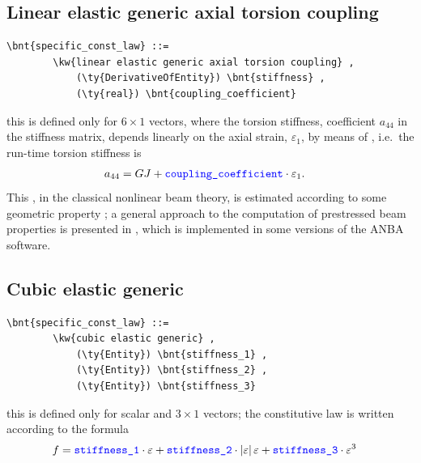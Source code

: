 \subsection{Linear elastic generic axial torsion coupling}
\label{sec:ConstitutiveLaw:LINEAR-ELASTIC-GENERIC-AXIAL-TORSION-COUPLING}
\begin{Verbatim}[commandchars=\\\{\}]
    \bnt{specific_const_law} ::= 
        \kw{linear elastic generic axial torsion coupling} ,
            (\ty{DerivativeOfEntity}) \bnt{stiffness} ,
            (\ty{real}) \bnt{coupling_coefficient}
\end{Verbatim}
this is defined only for $6 \times 1$ vectors, where the torsion stiffness,
coefficient $ a_{44} $ in the stiffness matrix, depends linearly on 
the axial strain, $ \varepsilon_1 $, by means of 
, i.e.\ the run-time torsion stiffness is 
\begin{align}
	a_{44}
	&=
	GJ + \textcolor{blue}{\texttt{coupling\_coefficient}} \cdot \varepsilon_1 .
\end{align}
This , in the classical nonlinear beam theory,
is estimated according to some geometric property \cite{HOUBOLT-BROOKS-1957};
a general approach to the computation of prestressed beam properties
is presented in \cite{BORRI-MERLINI}, which is implemented in some versions
of the ANBA software.

\subsection{Cubic elastic generic}
\begin{Verbatim}[commandchars=\\\{\}]
    \bnt{specific_const_law} ::= 
        \kw{cubic elastic generic} ,
            (\ty{Entity}) \bnt{stiffness_1} ,
            (\ty{Entity}) \bnt{stiffness_2} ,
            (\ty{Entity}) \bnt{stiffness_3}
\end{Verbatim}
this is defined only for scalar and $3 \times 1$ vectors; the constitutive
law is written according to the formula
\begin{align}
	f
	&=
	\textcolor{blue}{\texttt{stiffness\_1}} \cdot \varepsilon
	+ \textcolor{blue}{\texttt{stiffness\_2}} \cdot \left| \varepsilon \right|\varepsilon
	+ \textcolor{blue}{\texttt{stiffness\_3}} \cdot \varepsilon^3
\end{align}
%

